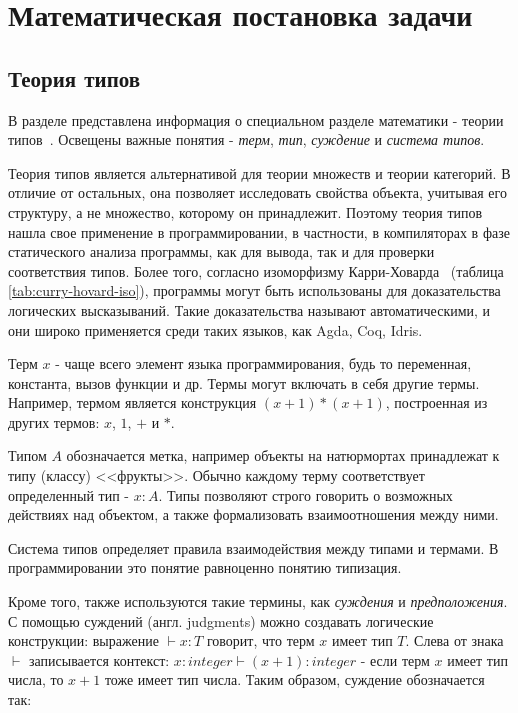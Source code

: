 \chapter{Математическая постановка задачи}
\label{ch:math}



\section{Теория типов}
\label{sec:type_theory}

В разделе представлена информация о специальном разделе математики - теории типов~\cite{TypeTheoryBook}.
Освещены важные понятия - \textit{терм}, \textit{тип}, \textit{суждение} и \textit{система типов}.

Теория типов является альтернативой для теории множеств и теории категорий.
В отличие от остальных, она позволяет исследовать свойства объекта, учитывая его структуру, а не множество, которому он принадлежит.
Поэтому теория типов нашла свое применение в программировании, в частности, в компиляторах в фазе статического анализа программы, как для вывода, так и для проверки соответствия типов.
Более того, согласно изоморфизму Карри-Ховарда~\cite{TypeTheoryArticle} (таблица \ref{tab:curry-hovard-iso}), программы могут быть использованы для доказательства логических высказываний.
Такие доказательства называют автоматическими, и они широко применяется среди таких языков, как Agda, Coq, Idris.

Терм $x$ - чаще всего элемент языка программирования, будь то переменная, константа, вызов функции и др.
Термы могут включать в себя другие термы.
Например, термом является конструкция $(x + 1) * (x + 1)$, построенная из других термов: $x$, $1$, $+$ и $*$.

Типом $A$ обозначается метка, например объекты на натюрмортах принадлежат к типу (классу) <<фрукты>>.
Обычно каждому терму соответствует определенный тип - $x: A$.
Типы позволяют строго говорить о возможных действиях над объектом, а также формализовать взаимоотношения между ними.

Система типов определяет правила взаимодействия между типами и термами.
В программировании это понятие равноценно понятию типизация.

Кроме того, также используются такие термины, как \textit{суждения} и \textit{предположения}.
С помощью суждений (англ. judgments) можно создавать логические конструкции: выражение $\vdash x: T$ говорит, что терм $x$ имеет тип $T$.
Слева от знака $\vdash$ записывается контекст: $x: integer \vdash (x + 1): integer$ - если терм $x$ имеет тип числа, то $x + 1$ тоже имеет тип числа.
Таким образом, суждение обозначается так:


